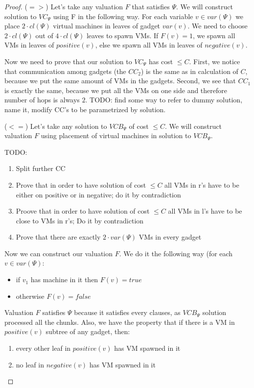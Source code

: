 \begin{proof}
($=>$)
Let's take any valuation $F$ that satisfies $\Psi$. We will construct
solution to $VC_{\Psi}$ using F in the following way. For each
variable $v \in var(\Psi)$ we place $2 \cdot cl(\Psi)$ virtual machines in
leaves of gadget $var(v)$. We need to choose $2\cdot cl(\Psi)$ out of
$4 \cdot cl(\Psi)$ leaves to spawn VMs. If $F(v) = 1$, we spawn all VMs in leaves
of $positive(v)$, else we spawn all VMs in leaves of
$negative(v)$.

Now we need to prove that our solution to $VC_{\Psi}$
has cost $\leq C$. First, we notice that communication among gadgets
(the $CC_2$) is the same as in calculation of $C$, because we put the
same amount of VMs in the gadgets. Second, we see that $CC_1$ is
exactly the same, because we put all the VMs on one side and therefore
number of hops is always $2$. TODO: find some way to refer to dummy
solution, name it, modify CC's to be parametrized by solution.

($<=$) Let's take any solution to $VCB_{\Psi}$ of cost $\leq C$. We
will construct valuation $F$ using placement of virtual machines in
solution to $VCB_{\Psi}$.

TODO:
\begin{enumerate}
\item Split further CC
\item Prove that in order to have solution of cost $\leq C$ all VMs in
r's have to be either on positive or in negative; do it by contradiction
\item Proove that in order to have solution of cost $\leq C$ all VMs
in l's have to be close to VMs in r's;
Do it by contradiction
\item Prove that there are exactly $2\cdot var(\Psi)$ VMs in every
gadget
\end{enumerate}

Now we can construct our valuation $F$. We do it the following way
(for each $v \in var(\Psi)$:

\begin{itemize}
\item if $v_1$ has machine in it then $F(v) = true$
\item otherwise $F(v) = false$
\end{itemize}

Valuation $F$ satisfies $\Psi$ because it satisfies every clauses, as
$VCB_{\Psi}$ solution processed all the chunks. Also, we have the
property that if there is a VM in $positive(v)$ subtree of any gadget,
then:
\begin{enumerate}
\item every other leaf in $positive(v)$ has VM spawned in it
\item no leaf in $negative(v)$ has VM spawned in it
\end{enumerate}


\end{proof}
